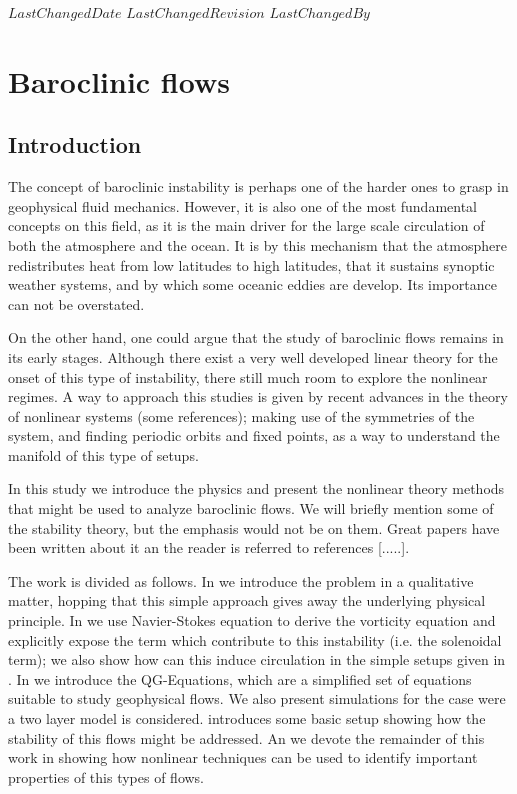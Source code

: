 {$LastChangedDate$}
{$LastChangedRevision$} {$LastChangedBy$}

\chapter{Baroclinic flows}
\label{chap:baroclinic}

\section{Introduction}
\label{s:intro}
The concept of baroclinic instability is perhaps one of the harder ones
to grasp in geophysical fluid mechanics. However, it is also one of the
most fundamental concepts on this field, as it is the main driver for the
large scale circulation of both the atmosphere and the ocean. It is by this
mechanism that the atmosphere redistributes heat from low latitudes to
high latitudes, that it sustains synoptic weather systems, and by which
some oceanic eddies are develop. Its importance can not be
overstated.

On the other hand, one could argue that the study of baroclinic flows
remains in its early stages. Although there exist a very well developed
linear theory for the onset of this type of instability, there still much
room to explore the nonlinear regimes. A way to approach this studies is
given by recent advances in the theory of nonlinear systems (some
references); making use of the symmetries of the system, and finding
periodic orbits and fixed points, as a way to understand the manifold of
this type of setups.

In this study we introduce the physics and present the nonlinear theory
methods that might be used to analyze baroclinic flows. We will briefly
mention some of the stability theory, but the emphasis would not be on
them. Great papers have been written about it an the reader is referred
to references [.....].

The work is divided as follows. In  we introduce the
problem in a qualitative matter, hopping that this simple approach gives
away the underlying physical principle. In  we
use Navier-Stokes equation to derive the vorticity equation and
explicitly expose the term which contribute to this instability (i.e. the
solenoidal term); we also show how can this induce circulation in the
simple setups given in . In  we
introduce the QG-Equations, which are a simplified set of equations
suitable to study geophysical flows. We also present simulations for the
case were a two layer model is considered.  
introduces some basic setup showing how the stability of this flows might
be addressed. An we devote the remainder of this work in showing how
nonlinear techniques can be used to identify important properties of this
types of flows.

